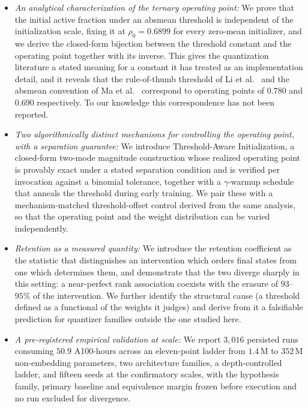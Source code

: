 \documentclass[final,5p,times,twocolumn]{elsarticle}
\theoremstyle{remark}
\newcommand{\rhoz}{\rho_{0}}
\begin{document}
\begin{itemize}
\item[] \textit{An analytical characterization of the ternary operating point:}
We prove that the initial active fraction under an absmean threshold is
independent of the initialization scale, fixing it at $\rhoz = 0.6899$ for
every zero-mean initializer, and we derive the closed-form bijection between
the threshold constant and the operating point together with its inverse. This
gives the quantization literature a stated meaning for a constant it has
treated as an implementation detail, and it reveals that the rule-of-thumb
threshold of Li et al.~\cite{li2016} and the absmean convention of
Ma et al.~\cite{ma2024} correspond to operating points of $0.780$ and $0.690$
respectively. To our knowledge this correspondence has not been reported.

\item[] \textit{Two algorithmically distinct mechanisms for controlling the
operating point, with a separation guarantee:} We introduce Threshold-Aware
Initialization, a closed-form two-mode magnitude construction whose realized
operating point is provably exact under a stated separation condition and is
verified per invocation against a binomial tolerance, together with a
$\gamma$-warmup schedule that anneals the threshold during early training. We
pair these with a mechanism-matched threshold-offset control derived from the
same analysis, so that the operating point and the weight distribution can be
varied independently.

\item[] \textit{Retention as a measured quantity:} We introduce the retention
coefficient as the statistic that distinguishes an intervention which orders
final states from one which determines them, and demonstrate that the two
diverge sharply in this setting: a near-perfect rank association coexists with
the erasure of $93$--$95\%$ of the intervention. We further identify the
structural cause (a threshold defined as a functional of the weights it
judges) and derive from it a falsifiable prediction for quantizer families
outside the one studied here.

\item[] \textit{A pre-registered empirical validation at scale:} We report
$3{,}016$ persisted runs consuming $50.9$ A100-hours across an eleven-point
ladder from $1.4$\,M to $352$\,M non-embedding parameters, two architecture
families, a depth-controlled ladder, and fifteen seeds at the confirmatory
scales, with the hypothesis family, primary baseline and equivalence margin
frozen before execution and no run excluded for divergence.


\end{itemize}
\end{document}
